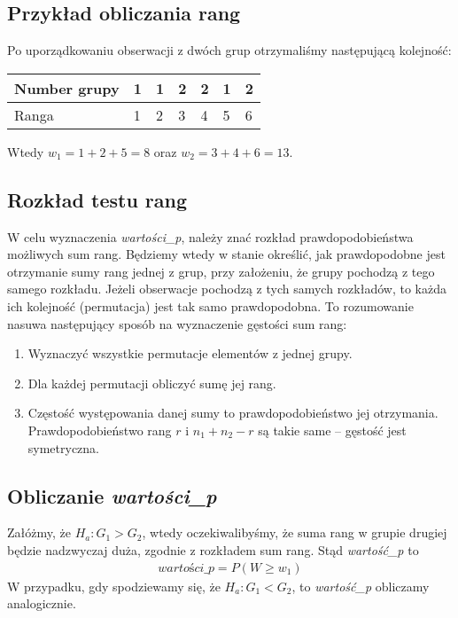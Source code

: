 \documentclass[a4paper]{article}
\begin{document}
\subsection{Przykład obliczania rang}
Po uporządkowaniu obserwacji z dwóch grup otrzymaliśmy następującą kolejność:
\begin{center}
   \begin{tabular}{ | l | l | l | l | l | l | l | }
    \hline
    Number grupy & 1 & 1 & 2 & 2 & 1 & 2 \\ \hline
    Ranga        & 1 & 2 & 3 & 4 & 5 & 6 \\ \hline
    \end{tabular}
\end{center}

Wtedy $w_1 = 1 + 2 + 5 = 8$ oraz $w_2 = 3 + 4 + 6 = 13$.

\subsection{Rozkład testu rang}
W celu wyznaczenia \textit{wartości\_p}, należy znać rozkład prawdopodobieństwa możliwych sum rang. Będziemy wtedy w stanie określić, jak prawdopodobne jest otrzymanie sumy rang jednej z grup, przy założeniu, że grupy pochodzą z tego samego rozkładu. Jeżeli obserwacje pochodzą z tych samych rozkładów, to każda ich kolejność (permutacja) jest tak samo prawdopodobna. To rozumowanie nasuwa następujący sposób na wyznaczenie gęstości sum rang:
\begin{enumerate}
    \item Wyznaczyć wszystkie permutacje elementów z jednej grupy.
    \item Dla każdej permutacji obliczyć sumę jej rang. 
    \item Częstość występowania danej sumy to prawdopodobieństwo jej otrzymania. Prawdopodobieństwo rang $r$ i $n_1 + n_2 - r$ są takie same -- gęstość jest symetryczna.

\end{enumerate}

\subsection{Obliczanie \textit{wartości\_p}}
Załóżmy, że $H_a : G_1 > G_2$, wtedy oczekiwalibyśmy, że suma rang w grupie drugiej będzie nadzwyczaj duża, zgodnie z rozkładem sum rang. Stąd \textit{wartość\_p} to 
\begin{align}
     \textit{wartości\_p} = P(W \geq w_1)
\end{align}
W przypadku, gdy spodziewamy się, że $H_a : G_1 < G_2$, to \textit{wartość\_p} obliczamy analogicznie.
\end{document}
